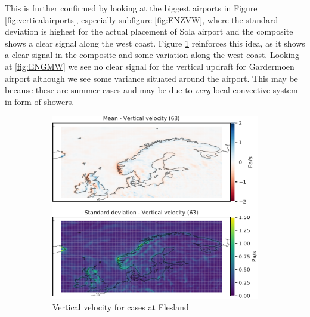 This is further confirmed by looking at the biggest airports in Figure \ref{fig:verticalairports}, especially subfigure \ref{fig:ENZVW}, where the standard deviation is highest for the actual placement of Sola airport and the composite shows a clear signal along the west coast. Figure \ref{fig:ENBRW} reinforces this idea, as it shows a clear signal in the composite and some variation along the west coast. Looking at \ref{fig:ENGMW} we see no clear signal for the vertical updraft for Gardermoen airport although we see some variance situated around the airport. This may be because these are summer cases and may be due to \textit{very} local convective system in form of showers.

\begin{figure}
     \centering
     \begin{subfigure}[b]{0.49\textwidth}
         \centering
         \includegraphics[width=\textwidth]{Figures/WENBR.pdf}
         \caption{Vertical velocity for cases at Flesland}
         \label{fig:ENBRW}
     \end{subfigure}
     \hfill
     \begin{subfigure}[b]{0.49\textwidth}
         \centering

\end{subfigure}
\end{figure}
